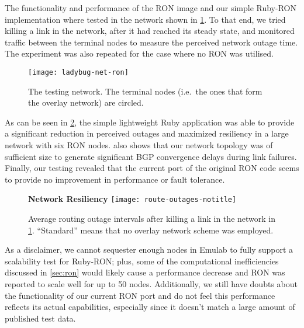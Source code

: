 The functionality and performance of the RON image and our simple Ruby-RON
implementation where tested in the network shown in
\cref{fig:ladybug-net-ron}. To that end, we tried killing a link in the
network, after it had reached its steady state, and monitored traffic
between the terminal nodes to measure the perceived network outage
time. The experiment was also repeated for the case where no RON was
utilised.

\begin{figure}
  \centering
  \texttt{[image: ladybug-net-ron]}
  \caption{The testing network. The terminal nodes (i.e.\ the ones that
    form the overlay network) are circled.}
  \label{fig:ladybug-net-ron}
\end{figure}

As can be seen in \cref{fig:perf-ladybug}, the simple lightweight Ruby
application was able to provide a significant reduction in perceived
outages and maximized resiliency in a large network with six RON nodes.
 also shows that our network topology was of
sufficient size to generate significant BGP convergence delays during link
failures.  Finally, our testing revealed that the current port of the
original RON code seems to provide no improvement in performance or fault
tolerance.

\begin{figure}
  \centering
  {\large \bfseries \sffamily Network Resiliency}
  \texttt{[image: route-outages-notitle]}
  \caption{Average routing outage intervals after killing a link in the
    network in \cref{fig:ladybug-net-ron}. ``Standard'' means that no
    overlay network scheme was employed.}
  \label{fig:perf-ladybug}
\end{figure}

As a disclaimer, we cannot sequester enough nodes in Emulab to fully
support a scalability test for Ruby-RON; plus, some of the computational
inefficiencies discussed in \cref{sec:ron} would likely cause a performance
decrease and RON was reported to scale well for up to 50 nodes.
Additionally, we still have doubts about the functionality of our current
RON port and do not feel this performance reflects its actual capabilities,
especially since it doesn't match a large amount of published test data.



